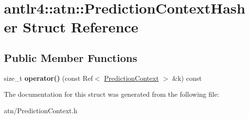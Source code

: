 \hypertarget{structantlr4_1_1atn_1_1PredictionContextHasher}{}\section{antlr4\+:\+:atn\+:\+:Prediction\+Context\+Hasher Struct Reference}
\label{structantlr4_1_1atn_1_1PredictionContextHasher}
\subsection*{Public Member Functions}
\begin{DoxyCompactItemize}
\item 
\mbox{\label{structantlr4_1_1atn_1_1PredictionContextHasher_a7ab48a41b4efb9da94ede04b0684e0bc}} 
size\+\_\+t {\bfseries operator()} (const Ref$<$ \hyperlink{classantlr4_1_1atn_1_1PredictionContext}{Prediction\+Context} $>$ \&k) const
\end{DoxyCompactItemize}


The documentation for this struct was generated from the following file\+:\begin{DoxyCompactItemize}
\item 
atn/Prediction\+Context.\+h\end{DoxyCompactItemize}
